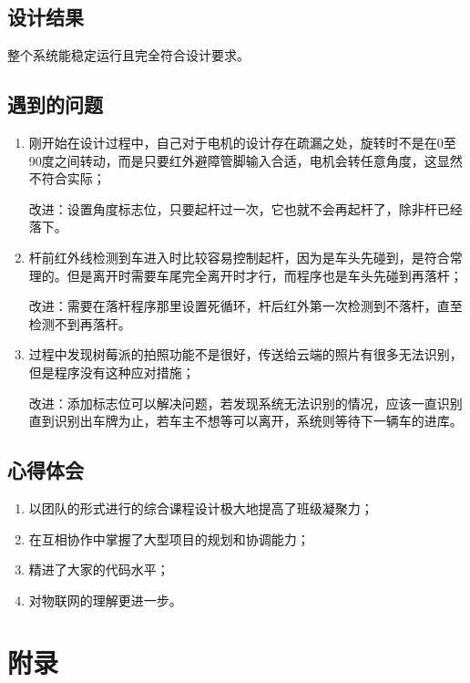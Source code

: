 \documentclass[a4paper]{ctexart}
\begin{document}
\subsection{设计结果}
整个系统能稳定运行且完全符合设计要求。

\subsection{遇到的问题}
\begin{enumerate}
	\item 刚开始在设计过程中，自己对于电机的设计存在疏漏之处，旋转时不是在0至90度之间转动，而是只要红外避障管脚输入合适，电机会转任意角度，这显然不符合实际；
	
	改进：设置角度标志位，只要起杆过一次，它也就不会再起杆了，除非杆已经落下。

	\item 杆前红外线检测到车进入时比较容易控制起杆，因为是车头先碰到，是符合常理的。但是离开时需要车尾完全离开时才行，而程序也是车头先碰到再落杆；
	
	改进：需要在落杆程序那里设置死循环，杆后红外第一次检测到不落杆，直至检测不到再落杆。

	\item 过程中发现树莓派的拍照功能不是很好，传送给云端的照片有很多无法识别，但是程序没有这种应对措施；
	
	改进：添加标志位可以解决问题，若发现系统无法识别的情况，应该一直识别直到识别出车牌为止，若车主不想等可以离开，系统则等待下一辆车的进库。
\end{enumerate}

\subsection{心得体会}
\begin{enumerate}
	\item 以团队的形式进行的综合课程设计极大地提高了班级凝聚力；
	\item 在互相协作中掌握了大型项目的规划和协调能力；
	\item 精进了大家的代码水平；
	\item 对物联网的理解更进一步。
\end{enumerate}

\newpage
\section*{附录}\appendix

\end{document}
